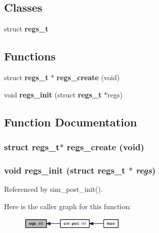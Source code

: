 \subsection*{Classes}
\begin{CompactItemize}
\item 
struct {\bf regs\_\-t}
\end{CompactItemize}
\subsection*{Functions}
\begin{CompactItemize}
\item 
struct {\bf regs\_\-t} $\ast$ {\bf regs\_\-create} (void)
\item 
void {\bf regs\_\-init} (struct {\bf regs\_\-t} $\ast$regs)
\end{CompactItemize}


\subsection{Function Documentation}
\subsubsection[{regs\_\-create}]{\setlength{\rightskip}{0pt plus 5cm}struct {\bf regs\_\-t}$\ast$ regs\_\-create (void)\hspace{0.3cm}{\tt  [read]}}\label{regs_8h_36850f9c2b504e033f0e475c55e93ddb}


\subsubsection[{regs\_\-init}]{\setlength{\rightskip}{0pt plus 5cm}void regs\_\-init (struct {\bf regs\_\-t} $\ast$ {\em regs})}\label{regs_8h_1c61451a98ebffdc6844774223f78de5}




Referenced by sim\_\-post\_\-init().

Here is the caller graph for this function:\nopagebreak
\begin{figure}[H]
\begin{center}
\leavevmode
\includegraphics[width=141pt]{regs_8h_1c61451a98ebffdc6844774223f78de5_icgraph}
\end{center}
\end{figure}
